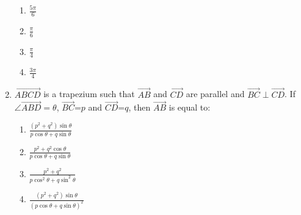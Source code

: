 \documentclass[journal,12pt,twocolumn]{IEEEtran}
\theoremstyle{remark}
\begin{document}
\begin{enumerate}
\hfill{}
\begin{multicols}{4}
\begin{enumerate}
\item $\frac{5\pi}{6}$
\columnbreak
\item $\frac{\pi}{6}$
\columnbreak
\item $\frac{\pi}{4}$
\columnbreak
\item $\frac{3\pi}{4}$
\end{enumerate} 
\end{multicols}
\item $\vec{ABCD}$ is a trapezium such that $\vec{AB}$ and $\vec{CD}$ are parallel and $\vec{BC}\perp\vec{CD}$. If $\angle\vec{ABD}=\theta$, $\vec{BC}$=$p$ and $\vec{CD}$=$q$, then $\vec{AB}$ is equal to:
\hfill{}
\begin{multicols}{2} 
\begin{enumerate}
\item $\frac{(p^2+q^2)\sin\theta}{p\cos\theta+q\sin\theta}$
\item $\frac{p^2+q^2\cos\theta}{p\cos\theta+q\sin\theta}$
\columnbreak
\item $\frac{p^2+q^2}{p\cos^2 \theta+q\sin^2 \theta}$
\item $\frac{(p^2+q^2)\sin\theta}{(p\cos\theta+q\sin\theta)^2}$
\end{enumerate}
\end{multicols}
\end{enumerate}
\end{document}
